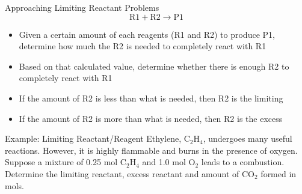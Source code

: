 \documentclass[11pt]{beamer}
\begin{document}
\begin{frame}{Approaching Limiting Reactant Problems}
  \begin{equation}
    \text{R1} + \text{R2} \rightarrow \text{P1}
  \end{equation}
  \begin{itemize}
  \item Given a certain amount of each reagents (R1 and R2)
    to produce P1, determine
    how much the R2 is needed to completely react with R1
  \item Based on that calculated value, determine whether
    there is enough R2 to completely react with R1
  \item If the amount of R2 is less than what is needed,
    then R2 is the limiting
  \item If the amount of R2 is more than what is needed,
    then R2 is the excess
  \end{itemize}
\end{frame}

\begin{frame}{Example: Limiting Reactant/Reagent}
  Ethylene, C$_2$H$_4$, undergoes many useful reactions. However,
  it is highly flammable and burns in the presence of oxygen. Suppose
  a mixture of 0.25 mol C$_2$H$_4$ and 1.0 mol O$_2$ leads to a combustion.
  Determine the limiting reactant, excess reactant and amount of CO$_2$
  formed in mols.
  
  \vfill
\end{frame}
\end{document}
